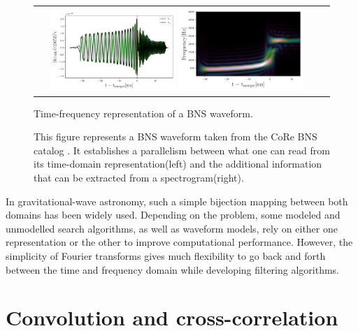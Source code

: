 \begin{figure}[hbt!]
\begin{center}
\begin{tabular}{cc}
\includegraphics[width=0.45\textwidth, angle=0]{images/Data_analysis/sig_proc/2_2L.pdf}

\includegraphics[width=0.45\textwidth, angle=0]{images/Data_analysis/sig_proc/2_2R.pdf}
\end{tabular}
\end{center}
\captionsetup{width=0.8\textwidth}
\caption{Time-frequency representation of a BNS waveform.}
\caption*{This figure represents a BNS waveform taken from the CoRe BNS catalog \cite{Dietrich:2018phi}. It establishes a parallelism between what one can read from its time-domain representation(left) and the additional information that can be extracted from a spectrogram(right).}
\label{fig:2}
\end{figure}

\FloatBarrier

In gravitational-wave astronomy, such a simple bijection mapping between both domains has been widely used. Depending on the problem, some modeled and unmodelled search algorithms, as well as waveform models, rely on either one representation or the other to improve computational performance. However, the simplicity of Fourier transforms gives much flexibility to go back and forth between the time and frequency domain while developing filtering algorithms. 


\section{Convolution and cross-correlation}

